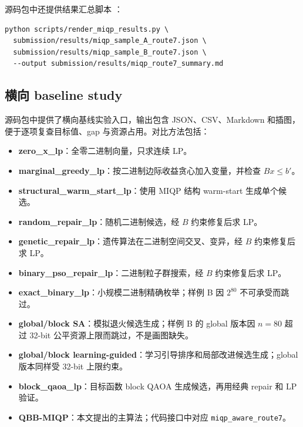 \documentclass[UTF8,a4paper,11pt]{ctexart}
\begin{document}
源码包中还提供结果汇总脚本 ：

\begin{verbatim}
python scripts/render_miqp_results.py \
  submission/results/miqp_sample_A_route7.json \
  submission/results/miqp_sample_B_route7.json \
  --output submission/results/miqp_route7_summary.md
\end{verbatim}

\subsection{横向 baseline study}

源码包中提供了横向基线实验入口，输出包含 JSON、CSV、Markdown 和插图，便于逐项复查目标值、gap 与资源占用。对比方法包括：

\begin{itemize}
  \item \textbf{zero\_x\_lp}：全零二进制向量，只求连续 LP。
  \item \textbf{marginal\_greedy\_lp}：按二进制边际收益贪心加入变量，并检查 $Bx\le b'$。
  \item \textbf{structural\_warm\_start\_lp}：使用 MIQP 结构 warm-start 生成单个候选。
  \item \textbf{random\_repair\_lp}：随机二进制候选，经 $B$ 约束修复后求 LP。
  \item \textbf{genetic\_repair\_lp}：遗传算法在二进制空间交叉、变异，经 $B$ 约束修复后求 LP。
  \item \textbf{binary\_pso\_repair\_lp}：二进制粒子群搜索，经 $B$ 约束修复后求 LP。
  \item \textbf{exact\_binary\_lp}：小规模二进制精确枚举；样例 B 因 $2^{80}$ 不可承受而跳过。
  \item \textbf{global/block SA}：模拟退火候选生成；样例 B 的 global 版本因 $n=80$ 超过 32-bit 公平资源上限而跳过，不是画图缺失。
  \item \textbf{global/block learning-guided}：学习引导排序和局部改进候选生成；global 版本同样受 32-bit 上限约束。
  \item \textbf{block\_qaoa\_lp}：目标函数 block QAOA 生成候选，再用经典 repair 和 LP 验证。
  \item \textbf{QBB-MIQP}：本文提出的主算法；代码接口中对应 \texttt{miqp\_aware\_route7}。
\end{itemize}
\end{document}
